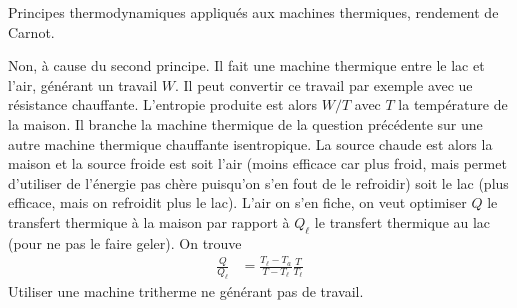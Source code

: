 \begin{solution}
\begin{questions}
    \questioncours Principes thermodynamiques appliqués aux machines thermiques, rendement de Carnot.
    \question 
\begin{center}
\end{center}
    \question Non, à cause du second principe.
    \question Il fait une machine thermique entre le lac et l'air, générant un travail $W$. Il peut convertir ce travail par exemple avec ue résistance chauffante. L'entropie produite est alors $W/T$ avec $T$ la température de la maison.
    \question Il branche la machine thermique de la question précédente sur une autre machine thermique chauffante isentropique. La source chaude est alors la maison et la source froide est soit l'air (moins efficace car plus froid, mais permet d'utiliser de l'énergie pas chère puisqu'on s'en fout de le refroidir) soit le lac (plus efficace, mais on refroidit plus le lac). 
    \question L'air on s'en fiche, on veut optimiser $Q$ le transfert thermique à la maison par rapport à $Q_\ell$ le transfert thermique au lac (pour ne pas le faire geler). On trouve 
    \begin{align*}
        \frac{Q}{Q_\ell} &= \frac{T_\ell - T_a}{T - T_\ell}\frac{T}{T_\ell}
    \end{align*}
    \question Utiliser une machine tritherme ne générant pas de travail.
\end{questions}
\end{solution}